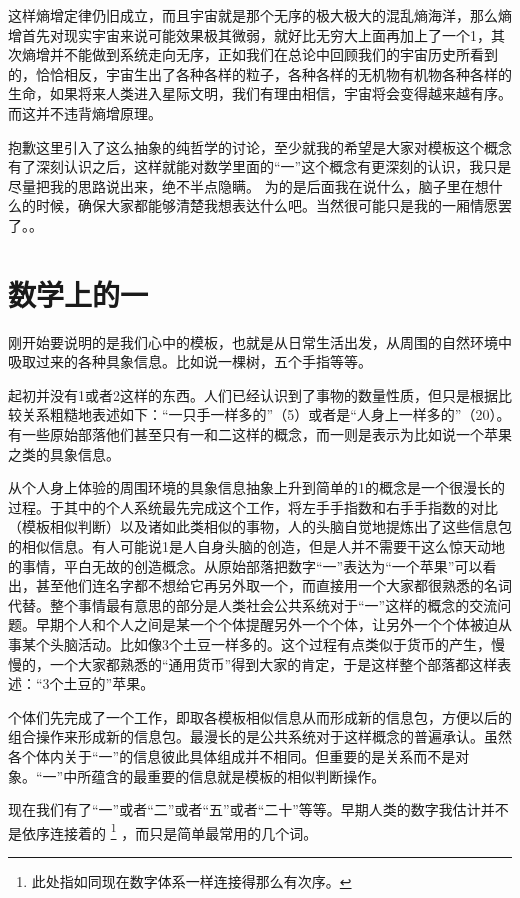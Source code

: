 \documentclass[11pt,oneside]{article}
\begin{document}
这样熵增定律仍旧成立，而且宇宙就是那个无序的极大极大的混乱熵海洋，那么熵增首先对现实宇宙来说可能效果极其微弱，就好比无穷大上面再加上了一个1，其次熵增并不能做到系统走向无序，正如我们在总论中回顾我们的宇宙历史所看到的，恰恰相反，宇宙生出了各种各样的粒子，各种各样的无机物有机物各种各样的生命，如果将来人类进入星际文明，我们有理由相信，宇宙将会变得越来越有序。而这并不违背熵增原理。

抱歉这里引入了这么抽象的纯哲学的讨论，至少就我的希望是大家对模板这个概念有了深刻认识之后，这样就能对数学里面的“一”这个概念有更深刻的认识，我只是尽量把我的思路说出来，绝不半点隐瞒。 为的是后面我在说什么，脑子里在想什么的时候，确保大家都能够清楚我想表达什么吧。当然很可能只是我的一厢情愿罢了。。



\section{数学上的一}
\label{sec-2}
刚开始要说明的是我们心中的模板，也就是从日常生活出发，从周围的自然环境中吸取过来的各种具象信息。比如说一棵树，五个手指等等。

起初并没有1或者2这样的东西。人们已经认识到了事物的数量性质，但只是根据比较关系粗糙地表述如下：“一只手一样多的”（5）或者是“人身上一样多的”（20）。有一些原始部落他们甚至只有一和二这样的概念，而一则是表示为比如说一个苹果之类的具象信息。

从个人身上体验的周围环境的具象信息抽象上升到简单的1的概念是一个很漫长的过程。于其中的个人系统最先完成这个工作，将左手手指数和右手手指数的对比（模板相似判断）以及诸如此类相似的事物，人的头脑自觉地提炼出了这些信息包的相似信息。有人可能说1是人自身头脑的创造，但是人并不需要干这么惊天动地的事情，平白无故的创造概念。从原始部落把数字“一”表达为“一个苹果”可以看出，甚至他们连名字都不想给它再另外取一个，而直接用一个大家都很熟悉的名词代替。整个事情最有意思的部分是人类社会公共系统对于“一”这样的概念的交流问题。早期个人和个人之间是某一个个体提醒另外一个个体，让另外一个个体被迫从事某个头脑活动。比如像3个土豆一样多的。这个过程有点类似于货币的产生，慢慢的，一个大家都熟悉的“通用货币”得到大家的肯定，于是这样整个部落都这样表述：“3个土豆的”苹果。

个体们先完成了一个工作，即取各模板相似信息从而形成新的信息包，方便以后的组合操作来形成新的信息包。最漫长的是公共系统对于这样概念的普遍承认。虽然各个体内关于“一”的信息彼此具体组成并不相同。但重要的是关系而不是对象。“一”中所蕴含的最重要的信息就是模板的相似判断操作。

现在我们有了“一”或者“二”或者“五”或者“二十”等等。早期人类的数字我估计并不是依序连接着的 \footnote{此处指如同现在数字体系一样连接得那么有次序。} ，而只是简单最常用的几个词。
\end{document}
